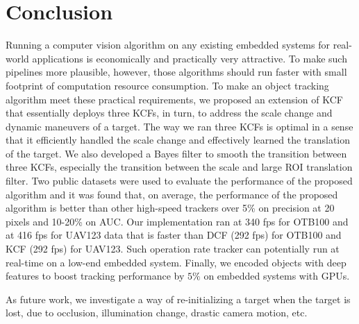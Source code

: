 \documentclass[10pt,twocolumn,letterpaper]{article}
\begin{document}
\section{Conclusion} \label{sc:Conclusion}
Running a computer vision algorithm on any existing embedded systems
for real-world applications is economically and practically very
attractive. To make such pipelines more plausible, however, those
algorithms should run faster with small footprint of computation
resource consumption. To make an object tracking algorithm meet these
practical requirements, we proposed an extension of KCF that
essentially deploys three KCFs, in turn, to address the scale change
and dynamic maneuvers of a target. The way we ran three KCFs is
optimal in a sense that it efficiently handled the scale change and
effectively learned the translation of the target. We also developed a
Bayes filter to smooth the transition between three KCFs, especially
the transition between the scale and large ROI translation filter.
Two public datasets were used to evaluate the performance of the
proposed algorithm and it was found that, on average, the performance
of the proposed algorithm is better than other high-speed trackers
over 5\% on precision at 20 pixels and 10-20\% on AUC. Our
implementation ran at 340 fps for OTB100 and at 416 fps for UAV123
data that is faster than DCF (292 fps) for OTB100 and KCF (292 fps)
for UAV123. Such operation rate tracker can potentially run at
real-time on a low-end embedded system. Finally, we encoded objects
with deep features to boost tracking performance by $5\%$ on embedded
systems with GPUs.

As future work, we investigate a way of re-initializing a target when
the target is lost, due to occlusion, illumination change, drastic
camera motion, etc.

{\small


}
\end{document}
